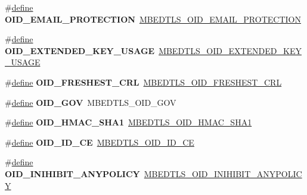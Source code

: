 \begin{DoxyCompactItemize}
\mbox{\label{compat-1_83_8h_a7f40b357ba1da1ad58dd192279af8404}} 
\#\hyperlink{structdefine}{define} {\bfseries O\+I\+D\+\_\+\+E\+M\+A\+I\+L\+\_\+\+P\+R\+O\+T\+E\+C\+T\+I\+ON}~\hyperlink{oid_8h_a96c02fe1530d4c737d2bf391cbd82f5e}{M\+B\+E\+D\+T\+L\+S\+\_\+\+O\+I\+D\+\_\+\+E\+M\+A\+I\+L\+\_\+\+P\+R\+O\+T\+E\+C\+T\+I\+ON}
\item 
\mbox{\label{compat-1_83_8h_ae688ca38359585375550e6e36c885f8a}} 
\#\hyperlink{structdefine}{define} {\bfseries O\+I\+D\+\_\+\+E\+X\+T\+E\+N\+D\+E\+D\+\_\+\+K\+E\+Y\+\_\+\+U\+S\+A\+GE}~\hyperlink{oid_8h_a19e9613b36efd1b1df43fb7da917b7f7}{M\+B\+E\+D\+T\+L\+S\+\_\+\+O\+I\+D\+\_\+\+E\+X\+T\+E\+N\+D\+E\+D\+\_\+\+K\+E\+Y\+\_\+\+U\+S\+A\+GE}
\item 
\mbox{\label{compat-1_83_8h_a2248c46b5e5513449d02611fbced032f}} 
\#\hyperlink{structdefine}{define} {\bfseries O\+I\+D\+\_\+\+F\+R\+E\+S\+H\+E\+S\+T\+\_\+\+C\+RL}~\hyperlink{oid_8h_a02b94a8cf5d24bf50eaf6452f605f384}{M\+B\+E\+D\+T\+L\+S\+\_\+\+O\+I\+D\+\_\+\+F\+R\+E\+S\+H\+E\+S\+T\+\_\+\+C\+RL}
\item 
\mbox{\label{compat-1_83_8h_a3cbafaaea95caa8ecd557217ab9df35b}} 
\#\hyperlink{structdefine}{define} {\bfseries O\+I\+D\+\_\+\+G\+OV}~M\+B\+E\+D\+T\+L\+S\+\_\+\+O\+I\+D\+\_\+\+G\+OV
\item 
\mbox{\label{compat-1_83_8h_a19882735a6d173483d77abef29d4541e}} 
\#\hyperlink{structdefine}{define} {\bfseries O\+I\+D\+\_\+\+H\+M\+A\+C\+\_\+\+S\+H\+A1}~\hyperlink{oid_8h_a88c68fe32598265ec347783e0d8fb81d}{M\+B\+E\+D\+T\+L\+S\+\_\+\+O\+I\+D\+\_\+\+H\+M\+A\+C\+\_\+\+S\+H\+A1}
\item 
\mbox{\label{compat-1_83_8h_ade05dbc72fd692bfd867530c95fdd57e}} 
\#\hyperlink{structdefine}{define} {\bfseries O\+I\+D\+\_\+\+I\+D\+\_\+\+CE}~\hyperlink{oid_8h_a45d181b92d2b42398cd8090214ab7548}{M\+B\+E\+D\+T\+L\+S\+\_\+\+O\+I\+D\+\_\+\+I\+D\+\_\+\+CE}
\item 
\mbox{\label{compat-1_83_8h_aa34a6059687df1a4608a825799516e0c}} 
\#\hyperlink{structdefine}{define} {\bfseries O\+I\+D\+\_\+\+I\+N\+I\+H\+I\+B\+I\+T\+\_\+\+A\+N\+Y\+P\+O\+L\+I\+CY}~\hyperlink{oid_8h_aea885904f5b5556d40b40e8cdea4aabf}{M\+B\+E\+D\+T\+L\+S\+\_\+\+O\+I\+D\+\_\+\+I\+N\+I\+H\+I\+B\+I\+T\+\_\+\+A\+N\+Y\+P\+O\+L\+I\+CY}

\end{DoxyCompactItemize}
